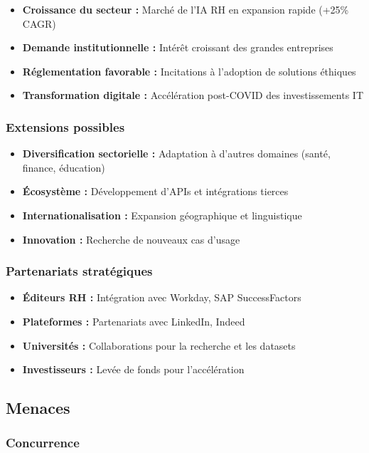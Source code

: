 \documentclass[12pt,a4paper]{report}
\begin{document}
\begin{itemize}
\item \textbf{Croissance du secteur :} Marché de l'IA RH en expansion rapide (+25\% CAGR)
\item \textbf{Demande institutionnelle :} Intérêt croissant des grandes entreprises
\item \textbf{Réglementation favorable :} Incitations à l'adoption de solutions éthiques
\item \textbf{Transformation digitale :} Accélération post-COVID des investissements IT
\end{itemize}

\subsubsection{Extensions possibles}

\begin{itemize}
\item \textbf{Diversification sectorielle :} Adaptation à d'autres domaines (santé, finance, éducation)
\item \textbf{Écosystème :} Développement d'APIs et intégrations tierces
\item \textbf{Internationalisation :} Expansion géographique et linguistique
\item \textbf{Innovation :} Recherche de nouveaux cas d'usage
\end{itemize}

\subsubsection{Partenariats stratégiques}

\begin{itemize}
\item \textbf{Éditeurs RH :} Intégration avec Workday, SAP SuccessFactors
\item \textbf{Plateformes :} Partenariats avec LinkedIn, Indeed
\item \textbf{Universités :} Collaborations pour la recherche et les datasets
\item \textbf{Investisseurs :} Levée de fonds pour l'accélération
\end{itemize}

\subsection{Menaces}

\subsubsection{Concurrence}
\end{document}
